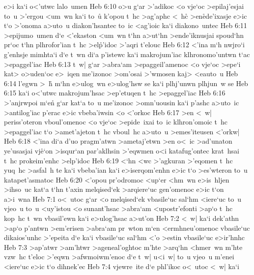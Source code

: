 e>i
ka`i
o<'utwc
lalo~umen\bibvsend
\vs Heb 6:10
o>u
g`ar
>'adikoc
<o
vje`oc
>epilaj'esjai
to~u
>'ergou
<um~wn
ka`i
to~u\r{}
k'opou
t~hc
>ag'aphc
<~h\r{c}
>en\r{e}de'ixasje
e>ic
t`o
>'onoma
a>uto~u
diakon'hsantec
to~ic
<ag'ioic
ka`i
diakono~untec\bibvsend
\vs Heb 6:11
>epijumo~umen
d`e
<'ekaston
<um~wn
t`hn
a>ut`hn
>ende'iknusjai
spoud`hn
pr`oc
t`hn
plhrofor'ian
t~hc
>el\r{p}'idoc
>'aqri
t'elouc\bibvsend
\vs Heb 6:12
<'ina
m`h
nwjro`i
g'enhsje
mimhta`i
d`e
t~wn
di`a
p'istewc
ka`i
makrojum'iac
klhronomo'untwn
t`ac
>epaggel'iac\bibvsend
\vs Heb 6:13
t~w|
g`ar
>abra`am
>epaggeil'amenoc
<o
vje`oc
>epe`i
kat>
o>uden`oc
e>~iqen
me'izonoc
>om'osai
>'wmosen
kaj>
<eauto~u\bibvsend
\vs Heb 6:14
l'egwn
>~h\r{}
m`hn
e>ulog~wn
e>ulog'hsw
se
ka`i
plhj'unwn
plhjun~w
se\bibvsend
\vs Heb 6:15
ka`i
o<'utwc
makrojum'hsac
>ep'etuqen
t~hc
>epaggel'iac\bibvsend
\vs Heb 6:16
>'anjrwpoi
m`e\r{n}
g`ar
kat`a
to~u
me'izonoc
>omn'uousin
ka`i
p'ashc
a>uto~ic
>antilog'iac
p'erac
e>ic
vbeba'iwsin
<o
<'orkoc\bibvsend
\vs Heb 6:17
>en
<~w|
periss'oteron
vboul'omenoc
<o
vje`oc
>epide~ixai
to~ic
klhron'omoic
t~hc
>epaggel'iac
t`o
>amet'ajeton
t~hc
vboul~hc
a>uto~u
>emes'iteusen
<'orkw|\bibvsend
\vs Heb 6:18
<'ina
di`a
d'uo
pragm'atwn
>ametaj'etwn
>en
o<~ic
>ad'unaton
ye'usasjai
vj\r{e}`on
>isqur`an
par'aklhsin
>'eqwmen
o<i
katafug'ontec
krat~hsai
t~hc
prokeim'enhc
>elp'idoc\bibvsend
\vs Heb 6:19
<`hn
<wc
>'agkuran
>'eqomen
t~hc
yuq~hc
>asfal~h
te
ka`i
vbeba'ian
ka`i
e>iserqom'enhn
e>ic
t`o
>es'wteron
to~u
katapet'asmatoc\bibvsend
\vs Heb 6:20
<'opou
pr'odromoc
<up`er
<hm~wn
e>is~hljen
>ihso~uc
kat`a
t`hn
t'axin
melqised`ek
>arqiere`uc
gen'omenoc
e>ic
t`on
a>i~wna\bibvsend
\vs Heb 7:1
o<~utoc
g`ar
<o
melqised`ek
vbasile`uc
sal`hm
<iere`uc
to~u
vjeo~u
to~u
<uy'istou
<o
sunant'hsac
>abra`am
<upostr'efonti
>ap`o
t~hc
kop~hc
t~wn
vbasil'ewn
ka`i
e>ulog'hsac
a>ut'on\bibvsend
\vs Heb 7:2
<~w|
ka`i
dek'athn
>ap`o
p'antwn
>em'erisen
>abra`am
pr~wton
m`en
<ermhneu'omenoc
vbasile`uc
dikaios'unhc
>'epeita
d`e
ka`i
vbasile`uc
sal`hm
<'o
>estin
vbasile`uc
e>ir'hnhc\bibvsend
\vs Heb 7:3
>ap'atwr
>am'htwr
>ageneal'oghtoc
m'hte
>arq`hn
<hmer~wn
m'hte
vzw~hc
t'eloc
>'eqwn
>afwmoiwm'enoc
d`e
t~w|
u<i~w|
to~u
vjeo~u
m'enei
<iere`uc
e>ic
t`o
dihnek'ec\bibvsend
\vs Heb 7:4
vjewre~ite
d`e
phl'ikoc
o<~utoc
<~w|
ka`i
